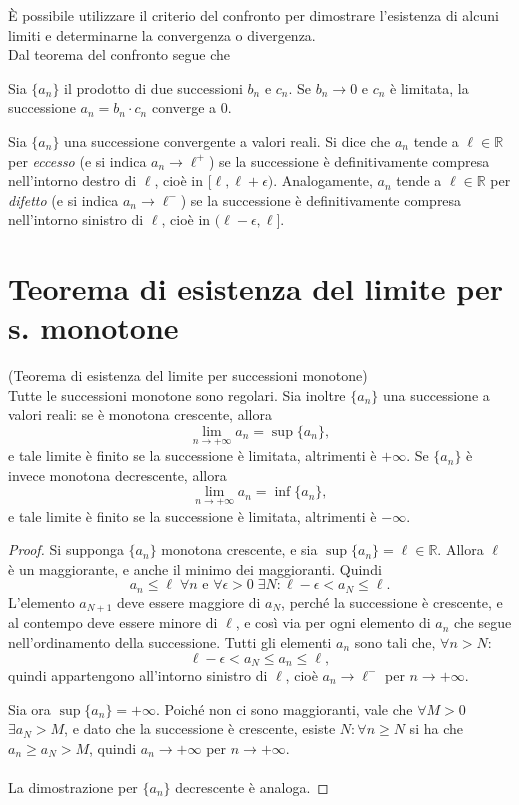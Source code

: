 \documentclass[a4paper,12pt, oneside]{book}
\begin{document}
È possibile utilizzare il criterio del confronto per dimostrare l'esistenza di alcuni limiti e determinarne la convergenza o divergenza.\\
Dal teorema del confronto segue che
\begin{osservazione}
	Sia $\{a_n\}$ il prodotto di due successioni $b_n$ e $c_n$. Se $b_n\to 0$ e $c_n$ è limitata, la successione $a_n=b_n\cdot c_n$ converge a 0.
\end{osservazione}
\begin{definizione}
	Sia $\{a_n\}$ una successione convergente a valori reali. Si dice che $a_n$ tende a $\ell\in\mathbb{R}$ per \emph{eccesso} (e si indica $a_n\to\ell^+$) se la successione è definitivamente compresa nell'intorno destro di $\ell$, cioè in $[\ell,\ell+\epsilon)$.
					Analogamente, $a_n$ tende a $\ell\in\mathbb{R}$ per \emph{difetto} (e si indica $a_n\to\ell^-$) se la successione è definitivamente compresa nell'intorno sinistro di $\ell$, cioè in $(\ell-\epsilon,\ell]$.
\end{definizione}
\section{Teorema di esistenza del limite per s. monotone}
\begin{teorema}(Teorema di esistenza del limite per successioni monotone)\\
	Tutte le successioni monotone sono regolari. Sia inoltre $\{a_n\}$ una successione a valori reali: se è monotona crescente, allora
	$$\lim_{n\to +\infty} a_n=\sup\{a_n\},$$
	e tale limite è finito se la successione è limitata, altrimenti è $+\infty$.
	Se $\{a_n\}$ è invece monotona decrescente, allora
	$$\lim_{n\to +\infty} a_n=\inf\{a_n\},$$
	e tale limite è finito se la successione è limitata, altrimenti è $-\infty$.
\end{teorema}
\begin{proof}
	Si supponga $\{a_n\}$ monotona crescente, e sia $\sup\{a_n\}=\ell\in\mathbb{R}$. Allora $\ell$ è un maggiorante, e anche il minimo dei maggioranti. Quindi
	$$a_n\leq\ell\;\forall n\text{ e }\forall\epsilon>0\;\exists N\colon\ell-\epsilon<a_N\leq\ell.$$
	L'elemento $a_{N+1}$ deve essere maggiore di $a_N$, perché la successione è crescente, e al contempo deve essere minore di $\ell$, e così via per ogni elemento di $a_n$ che segue nell'ordinamento della successione. Tutti gli elementi $a_n$ sono tali che, $\forall n>N$:
	$$\ell-\epsilon<a_N\leq a_n\leq\ell,$$
	quindi appartengono all'intorno sinistro di $\ell$, cioè $a_n\to\ell^-$ per $n\to +\infty$.

	Sia ora $\sup\{a_n\}=+\infty$. Poiché non ci sono maggioranti, vale che $\forall M>0$ $\exists a_N>M$, e dato che la successione è crescente, esiste $N\colon\forall n\geq N$ si ha che $a_n\geq a_N>M$, quindi $a_n\to +\infty$ per $n\to +\infty$.\\\\
	La dimostrazione per $\{a_n\}$ decrescente è analoga.
\end{proof}
\end{document}
